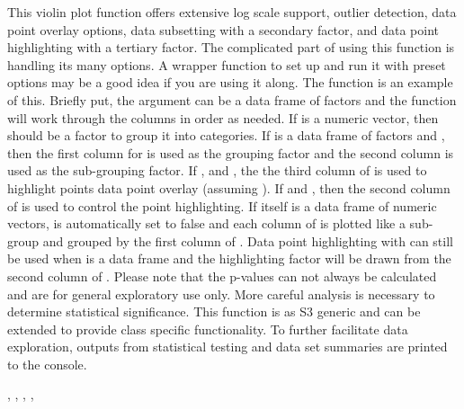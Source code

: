 \documentclass[a4paper]{book}
\begin{document}
\begin{Details}\relax
This violin plot function offers extensive log scale support, outlier detection, data point overlay options, data subsetting with a secondary factor, and data point highlighting with a tertiary factor.
The complicated part of using this function is handling its many options. A wrapper function to set up and run it with preset options may be a good idea if you are using it along. The function  is an example of this.
Briefly put, the  argument can be a data frame of factors and the function will  work through the columns in order as needed.
If  is a numeric vector, then  should be a factor to group it into categories. If  is a data frame of factors and , then the first column for 
is used as the grouping factor and the second column is used as the sub-grouping factor. If , and , the the third column of 
is used to highlight points data point overlay (assuming ). If  and , then the second column of  is used to control
the point highlighting. If  itself is a data frame of numeric vectors,  is automatically set to false and each column of  is plotted like a sub-group and grouped
by the first column of . Data point highlighting with  can still be used when  is a data frame and the highlighting factor will be drawn from the second column of .
Please note that the p-values can not always be calculated and are for general exploratory use only. More careful analysis is necessary to determine statistical significance.
This function is as S3 generic and can be extended to provide class specific functionality. To further facilitate data exploration, outputs from statistical testing and data set summaries
are printed to the console.
\end{Details}
%
\begin{SeeAlso}\relax
{}, , , , 
\end{SeeAlso}
%
\end{document}
